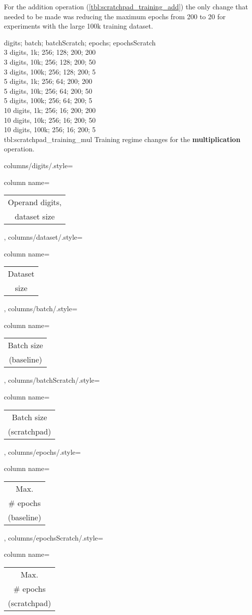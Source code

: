 For the addition operation (\cref{tbl:scratchpad_training_add}) the only change that needed to be made was reducing the maximum epochs from 200 to 20 for experiments with the large 100k training dataset.

{
    digits; batch; batchScratch; epochs; epochsScratch\\
    3 digits,  1k;  256; 128; 200; 200\\
    3 digits,  10k;  256; 128; 200; 50\\
    3 digits,  100k;  256; 128; 200; 5\\
    5 digits,  1k;  256; 64; 200; 200\\
    5 digits,  10k;  256; 64; 200; 50\\
    5 digits,  100k;  256; 64; 200; 5\\
    10 digits,  1k;  256; 16; 200; 200\\
    10 digits,  10k;  256; 16; 200; 50\\
    10 digits,  100k;  256; 16; 200; 5\\
}
{tbl:scratchpad_training_mul}
{
    Training regime changes for the \textbf{multiplication} operation.
}
{%
    columns/digits/.style={column name={\begin{tabular}{c}
         Operand digits, \\
         dataset size
    \end{tabular}}},
    columns/dataset/.style={column name={\begin{tabular}{c}
         Dataset \\
         size
    \end{tabular}}},
    columns/batch/.style={column name={\begin{tabular}{c}
         Batch size \\
         (baseline)
    \end{tabular}}},
    columns/batchScratch/.style={column name={\begin{tabular}{c}
         Batch size \\
         (scratchpad)
    \end{tabular}}},
    columns/epochs/.style={column name={\begin{tabular}{c}
         Max. \\
         \# epochs \\
         (baseline)
    \end{tabular}}},
    columns/epochsScratch/.style={column name={\begin{tabular}{c}
         Max. \\
         \# epochs \\
         (scratchpad)
    \end{tabular}}}
}

